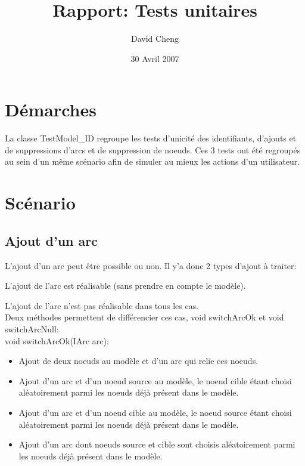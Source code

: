 \documentclass{article}
\title{Rapport: Tests unitaires}
\author{David Cheng}
\date{30 Avril 2007}
\begin{document}
\maketitle
\section{D\'emarches}

La classe TestModel\_ID regroupe les tests d'unicit\'e des identifiants,
d'ajouts et de suppressions d'arcs et de suppression de noeuds.
Ces 3 tests ont \'et\'e regroup\'es au sein d'un m\^eme sc\'enario afin de 
simuler au mieux les actions d'un utilisateur.


\section{Sc\'enario}
\subsection{Ajout d'un arc}

L'ajout d'un arc peut \^etre possible ou non.
Il y'a donc 2 types d'ajout \`a traiter:

L'ajout de l'arc est r\'ealisable (sans prendre en compte le mod\`ele).

L'ajout de l'arc n'est pas r\'ealisable dans tous les cas.
\\

Deux m\'ethodes permettent de diff\'erencier ces cas, void switchArcOk et 
void switchArcNull:
\\

void switchArcOk(IArc arc):

\begin{itemize}
\item Ajout de deux noeuds au mod\`ele et d'un arc qui relie ces noeuds.

\item Ajout d'un arc et d'un noeud source au mod\`ele, le noeud cible 
\'etant
choisi al\'eatoirement parmi les noeuds d\'ej\`a pr\'esent dans le mod\`ele.

\item Ajout d'un arc et d'un noeud cible au mod\`ele, le noeud source 
\'etant
choisi al\'eatoirement parmi les noeuds d\'ej\`a pr\'esent dans le mod\`ele.

\item Ajout d'un arc dont noeuds source et cible sont choisis 
al\'eatoirement
parmi les noeuds d\'ej\`a pr\'esent dans le mod\`ele.
\end{itemize}
\end{document}

